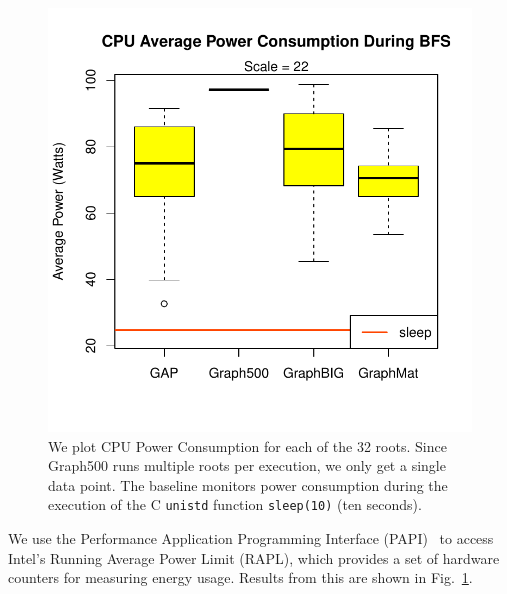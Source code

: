 \documentclass[conference]{IEEEtran}
\begin{document}
\begin{figure}
	\centering
	\begin{minipage}{0.7\linewidth}
		\includegraphics[width=\linewidth, trim=0 40pt 18pt 24pt, clip]{graphics/bfs_cpu_power.pdf}
	\end{minipage}
	\caption{We plot CPU Power Consumption for each of the 32 roots. Since Graph500 runs multiple roots per execution, we only get a single data point. The baseline monitors power consumption during the execution of the C \texttt{unistd} function \texttt{sleep(10)} (ten seconds).}
	\label{fig:power}
\end{figure}

We use the Performance Application Programming Interface (PAPI)~\cite{Browne:2000:PAPI} to access Intel's Running Average Power Limit (RAPL), which provides a set of hardware counters for measuring energy usage. Results from this are shown in Fig.~\ref{fig:power}.
\end{document}
